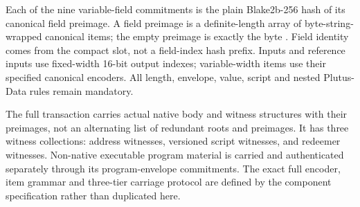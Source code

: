 \documentclass[../midgard.tex]{subfiles}
\begin{document}
Each of the nine variable-field commitments is the plain Blake2b-256 hash of its canonical field preimage.
A field preimage is a definite-length array of byte-string-wrapped canonical items; the empty preimage is exactly the byte .
Field identity comes from the compact slot, not a field-index hash prefix.
Inputs and reference inputs use fixed-width 16-bit output indexes; variable-width items use their specified canonical encoders.
All length, envelope, value, script and nested Plutus-Data rules remain mandatory.

The full transaction carries actual native body and witness structures with their preimages, not an alternating list of redundant roots and preimages.
It has three witness collections: address witnesses, versioned script witnesses, and redeemer witnesses.
Non-native executable program material is carried and authenticated separately through its program-envelope commitments.
The exact full encoder, item grammar and three-tier carriage protocol are defined by the component specification rather than duplicated here.
\end{document}
